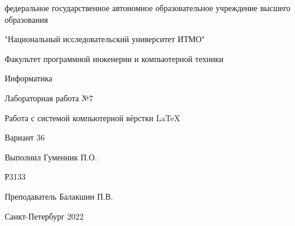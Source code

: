 \begin{center}
\large
федеральное государственное автономное образовательное учреждение высшего образования

"Национальный исследовательский университет ИТМО"

Факультет программной инженерии и компьютерной техники

\vspace{3cm}

Информатика

\vspace{3cm}
Лабораторная работа №7

Работа с системой
компьютерной вёрстки \LaTeX

Вариант 36

\end{center}
\vspace{5cm}
\normalsize{
\begin{flushright}
 Выполнил Гуменник П.О.
 
 Р3133
 
 Преподаватель Балакшин П.В. 
\end{flushright}
}
\null\vfill
\begin{center} Санкт-Петербург 2022 \end{center}
